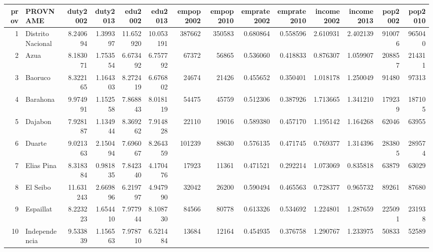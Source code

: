 \begin{tabular}{rlrrrrrrrrrrrr}
\toprule
 prov &                PROVNAME &   duty2002 &  duty2013 &    edu2002 &    edu2013 &  empop2002 &  empop2010 &  emprate2002 &  emprate2010 &  income2002 &  income2013 &  pop2002 &  pop2010 \\
\midrule
    1 &       Distrito Nacional &   8.240694 &  1.399397 &  11.652920 &  10.053191 &     387662 &     350583 &     0.680864 &     0.558596 &    2.610931 &    2.402139 &   910076 &   965040 \\
    2 &                    Azua &   8.183071 &  1.753554 &   6.673492 &   6.757792 &      67372 &      56865 &     0.536060 &     0.418833 &    0.876307 &    1.059907 &   208857 &   214311 \\
    3 &                 Baoruco &   8.322165 &  1.164303 &   8.272419 &   6.676802 &      24674 &      21426 &     0.455652 &     0.350401 &    1.018178 &    1.250049 &    91480 &    97313 \\
    4 &                Barahona &   9.974991 &  1.152558 &   7.868843 &   8.018119 &      54475 &      45759 &     0.512306 &     0.387926 &    1.713665 &    1.341210 &   179239 &   187105 \\
    5 &                 Dajabon &   7.928187 &  1.134944 &   8.369262 &   7.914828 &      22110 &      19016 &     0.589380 &     0.457170 &    1.195142 &    1.164268 &    62046 &    63955 \\
    6 &                  Duarte &   9.021363 &  2.150494 &   7.696067 &   8.264359 &     101239 &      88630 &     0.576135 &     0.471745 &    0.769377 &    1.314396 &   283805 &   289574 \\
    7 &              Elias Pina &   8.318384 &  0.981835 &   7.842340 &   4.170476 &      17923 &      11361 &     0.471521 &     0.292214 &    1.073069 &    0.835818 &    63879 &    63029 \\
    8 &                El Seibo &  11.631243 &  2.669896 &   6.219797 &   4.947990 &      32042 &      26200 &     0.590494 &     0.465563 &    0.728377 &    0.965732 &    89261 &    87680 \\
    9 &               Espaillat &   8.223223 &  1.654410 &   7.977944 &   8.108730 &      84566 &      80778 &     0.613326 &     0.534692 &    1.224801 &    1.287659 &   225091 &   231938 \\
   10 &           Independencia &   9.533839 &  1.156563 &   7.978710 &   6.521484 &      13684 &      12164 &     0.454935 &     0.376758 &    1.290767 &    1.233975 &    50833 &    52589 \\

\end{tabular}
